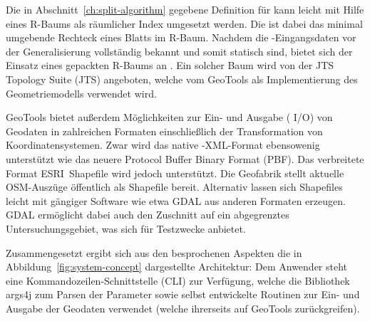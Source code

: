 \documentclass[../main/thesis.tex]{subfiles}
\begin{document}
Die in Abschnitt~\ref{ch:split-algorithm} gegebene Definition für  kann leicht mit Hilfe eines R-Baums als räumlicher Index umgesetzt werden.
Die  ist dabei das minimal umgebende Rechteck eines Blatts im R-Baum.
Nachdem die \osm-Eingangsdaten vor der Generalisierung vollständig bekannt und somit statisch sind, bietet sich der Einsatz eines gepackten R-Baums an .
Ein solcher Baum wird von der JTS Topology Suite (JTS) angeboten, welche vom  GeoTools als Implementierung des Geometriemodells verwendet wird.

GeoTools bietet außerdem Möglichkeiten zur Ein- und Ausgabe ( I/O) von Geodaten in zahlreichen Formaten einschließlich der Transformation von Koordinatensystemen.
Zwar wird das native \osm-XML-Format ebensowenig unterstützt wie das neuere Protocol Buffer Binary Format (PBF).
Das verbreitete Format ESRI~Shapefile wird jedoch unterstützt.
Die Geofabrik stellt aktuelle OSM-Auszüge öffentlich als Shapefile bereit.
Alternativ lassen sich Shapefiles leicht mit gängiger Software wie etwa GDAL aus anderen Formaten erzeugen.
GDAL ermöglicht dabei auch den Zuschnitt auf ein abgegrenztes Untersuchungsgebiet, was sich für Testzwecke anbietet.


Zusammengesetzt ergibt sich aus den besprochenen Aspekten die in Abbildung~\ref{fig:system-concept} dargestellte Architektur:
Dem Anwender steht eine Kommandozeilen-Schnittstelle (CLI) zur Verfügung, welche die Bibliothek args4j zum Parsen der Parameter sowie selbst entwickelte Routinen zur Ein- und Ausgabe der Geodaten verwendet (welche ihrerseits auf GeoTools zurückgreifen).
\end{document}
